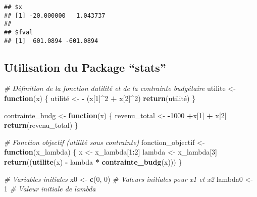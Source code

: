 \documentclass[
]{article}
\newenvironment{Shaded}{\begin{snugshade}}{\end{snugshade}}
\newcommand{\CommentTok}[1]{\textcolor[rgb]{0.56,0.35,0.01}{\textit{#1}}}
\newcommand{\ControlFlowTok}[1]{\textcolor[rgb]{0.13,0.29,0.53}{\textbf{#1}}}
\newcommand{\DecValTok}[1]{\textcolor[rgb]{0.00,0.00,0.81}{#1}}
\newcommand{\FunctionTok}[1]{\textcolor[rgb]{0.13,0.29,0.53}{\textbf{#1}}}
\newcommand{\NormalTok}[1]{#1}
\newcommand{\OtherTok}[1]{\textcolor[rgb]{0.56,0.35,0.01}{#1}}
\newcommand{\SpecialCharTok}[1]{\textcolor[rgb]{0.81,0.36,0.00}{\textbf{#1}}}
\begin{document}
\begin{verbatim}
## $x
## [1] -20.000000   1.043737
## 
## $fval
## [1]  601.0894 -601.0894
\end{verbatim}

\hypertarget{utilisation-du-package-stats}{%
\subsection{Utilisation du Package
``stats''}\label{utilisation-du-package-stats}}

\begin{Shaded}
\begin{Highlighting}[]
\CommentTok{\# Définition de la fonction d\textquotesingle{}utilité et de la contrainte budgétaire}
\NormalTok{utilite }\OtherTok{\textless{}{-}} \ControlFlowTok{function}\NormalTok{(x) \{}
\NormalTok{  utilité }\OtherTok{\textless{}{-}} \SpecialCharTok{{-}}\NormalTok{ (x[}\DecValTok{1}\NormalTok{]}\SpecialCharTok{\^{}}\DecValTok{2} \SpecialCharTok{+}\NormalTok{ x[}\DecValTok{2}\NormalTok{]}\SpecialCharTok{\^{}}\DecValTok{2}\NormalTok{)}
  \FunctionTok{return}\NormalTok{(utilité)}
\NormalTok{\}}

\NormalTok{contrainte\_budg }\OtherTok{\textless{}{-}} \ControlFlowTok{function}\NormalTok{(x) \{}
\NormalTok{  revenu\_total }\OtherTok{\textless{}{-}} \SpecialCharTok{{-}}\DecValTok{1000} \SpecialCharTok{+}\NormalTok{x[}\DecValTok{1}\NormalTok{] }\SpecialCharTok{+}\NormalTok{ x[}\DecValTok{2}\NormalTok{] }
  \FunctionTok{return}\NormalTok{(revenu\_total)}
\NormalTok{\}}

\CommentTok{\# Fonction objectif (utilité sous contrainte)}
\NormalTok{fonction\_objectif }\OtherTok{\textless{}{-}} \ControlFlowTok{function}\NormalTok{(x\_lambda) \{}
\NormalTok{  x }\OtherTok{\textless{}{-}}\NormalTok{ x\_lambda[}\DecValTok{1}\SpecialCharTok{:}\DecValTok{2}\NormalTok{]}
\NormalTok{  lambda }\OtherTok{\textless{}{-}}\NormalTok{ x\_lambda[}\DecValTok{3}\NormalTok{]}
  \FunctionTok{return}\NormalTok{((}\FunctionTok{utilite}\NormalTok{(x) }\SpecialCharTok{{-}}\NormalTok{ lambda }\SpecialCharTok{*} \FunctionTok{contrainte\_budg}\NormalTok{(x)))}
\NormalTok{\}}

\CommentTok{\# Variables initiales}
\NormalTok{x0 }\OtherTok{\textless{}{-}} \FunctionTok{c}\NormalTok{(}\DecValTok{0}\NormalTok{, }\DecValTok{0}\NormalTok{)  }\CommentTok{\# Valeurs initiales pour x1 et x2}
\NormalTok{lambda0 }\OtherTok{\textless{}{-}} \DecValTok{1}        \CommentTok{\# Valeur initiale de lambda}


\end{Highlighting}
\end{Shaded}
\end{document}
